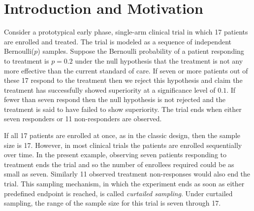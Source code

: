 \documentclass[sii]{ipart}
\begin{document}
\begin{frontmatter}
\begin{keyword}[class=AMS]
\end{keyword}

\begin{keyword}
\end{keyword}

 
\end{frontmatter}

\section{Introduction and Motivation}

Consider a prototypical early phase, single-arm clinical trial in which 17 patients
are enrolled and treated. The trial is modeled as a sequence of independent Bernoulli($p$) samples. Suppose the Bernoulli probability of a patient 
responding to treatment is $p=0.2$ under the null hypothesis that the treatment is not any more effective than the current standard of care.
If seven or more patients out of these 17 respond to the treatment then we 
reject this hypothesis and claim the treatment has successfully showed superiority at 
a significance level of $0.1$.  If fewer than seven respond then the null 
hypothesis is not rejected and the treatment is said to have failed to show superiority. The trial ends when 
either seven responders or 11 non-responders are observed.

If all 17 patients are enrolled at once, as in the classic
design, then the sample size is 17. However, in most clinical trials the
patients are enrolled sequentially over time.
In the present example, observing seven
patients responding to treatment ends the trial and so the number of 
enrollees required could be as small as seven. Similarly 11
observed treatment non-responses would also end the trial. This sampling mechanism, in
which the experiment ends as soon as either predefined endpoint is reached, is
called {\em curtailed sampling}. Under curtailed sampling, the range of the
sample size for this trial is seven through 17.
\end{document}
